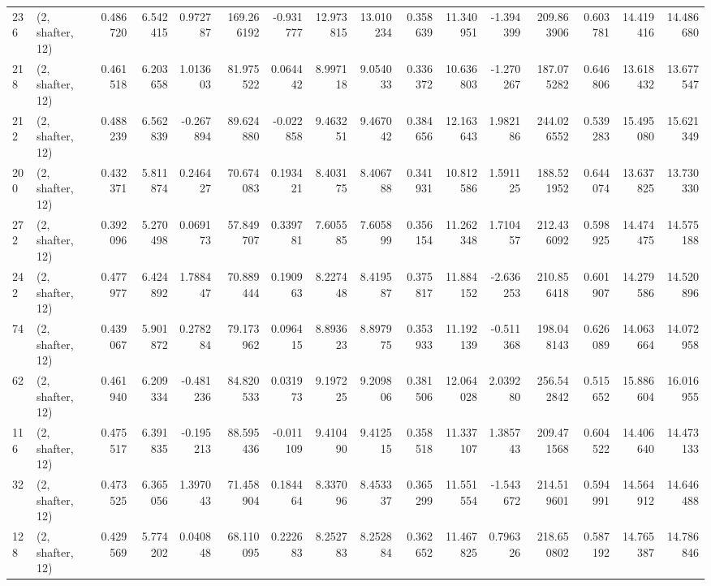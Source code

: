 \begin{tabular}{llrrrrrrrrrrrrrr}
236 &  (2, shafter, 12) &   0.486720 &   6.542415 &   0.972787 &   169.266192 &  -0.931777 &  12.973815 &  13.010234 &  0.358639 &  11.340951 &  -1.394399 &    209.863906 &    0.603781 &   14.419416 &   14.486680 \\
218 &  (2, shafter, 12) &   0.461518 &   6.203658 &   1.013603 &    81.975522 &   0.064442 &   8.997118 &   9.054033 &  0.336372 &  10.636803 &  -1.270267 &    187.075282 &    0.646806 &   13.618432 &   13.677547 \\
212 &  (2, shafter, 12) &   0.488239 &   6.562839 &  -0.267894 &    89.624880 &  -0.022858 &   9.463251 &   9.467042 &  0.384656 &  12.163643 &   1.982186 &    244.026552 &    0.539283 &   15.495080 &   15.621349 \\
200 &  (2, shafter, 12) &   0.432371 &   5.811874 &   0.246427 &    70.674083 &   0.193421 &   8.403175 &   8.406788 &  0.341931 &  10.812586 &   1.591125 &    188.521952 &    0.644074 &   13.637825 &   13.730330 \\
272 &  (2, shafter, 12) &   0.392096 &   5.270498 &   0.069173 &    57.849707 &   0.339781 &   7.605585 &   7.605899 &  0.356154 &  11.262348 &   1.710457 &    212.436092 &    0.598925 &   14.474475 &   14.575188 \\
242 &  (2, shafter, 12) &   0.477977 &   6.424892 &   1.788447 &    70.889444 &   0.190963 &   8.227448 &   8.419587 &  0.375817 &  11.884152 &  -2.636253 &    210.856418 &    0.601907 &   14.279586 &   14.520896 \\
74  &  (2, shafter, 12) &   0.439067 &   5.901872 &   0.278284 &    79.173962 &   0.096415 &   8.893623 &   8.897975 &  0.353933 &  11.192139 &  -0.511368 &    198.048143 &    0.626089 &   14.063664 &   14.072958 \\
62  &  (2, shafter, 12) &   0.461940 &   6.209334 &  -0.481236 &    84.820533 &   0.031973 &   9.197225 &   9.209806 &  0.381506 &  12.064028 &   2.039280 &    256.542842 &    0.515652 &   15.886604 &   16.016955 \\
116 &  (2, shafter, 12) &   0.475517 &   6.391835 &  -0.195213 &    88.595436 &  -0.011109 &   9.410490 &   9.412515 &  0.358518 &  11.337107 &   1.385743 &    209.471568 &    0.604522 &   14.406640 &   14.473133 \\
32  &  (2, shafter, 12) &   0.473525 &   6.365056 &   1.397043 &    71.458904 &   0.184464 &   8.337096 &   8.453337 &  0.365299 &  11.551554 &  -1.543672 &    214.519601 &    0.594991 &   14.564912 &   14.646488 \\
128 &  (2, shafter, 12) &   0.429569 &   5.774202 &   0.040848 &    68.110095 &   0.222683 &   8.252783 &   8.252884 &  0.362652 &  11.467825 &   0.796326 &    218.650802 &    0.587192 &   14.765387 &   14.786846 \\

\end{tabular}
